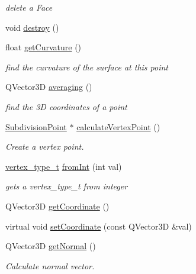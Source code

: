 \begin{DoxyCompactItemize}
\begin{DoxyCompactList}\small\item\em delete a Face \end{DoxyCompactList}\item 
void \hyperlink{classShipCADGeometry_1_1SubdivisionPoint_a63d20b811bb4af05b5f06014efd9385b}{destroy} ()
\item 
float \hyperlink{classShipCADGeometry_1_1SubdivisionPoint_aa07a859d70f97e57fc5318fc64a9d897}{get\-Curvature} ()
\begin{DoxyCompactList}\small\item\em find the curvature of the surface at this point \end{DoxyCompactList}\item 
Q\-Vector3\-D \hyperlink{classShipCADGeometry_1_1SubdivisionPoint_a0c9e47af796dacd9542d065bbd0d0fcf}{averaging} ()
\begin{DoxyCompactList}\small\item\em find the 3\-D coordinates of a point \end{DoxyCompactList}\item 
\hyperlink{classShipCADGeometry_1_1SubdivisionPoint}{Subdivision\-Point} $\ast$ \hyperlink{classShipCADGeometry_1_1SubdivisionPoint_a92632ddbe28fb6901e445b60eab8d3ee}{calculate\-Vertex\-Point} ()
\begin{DoxyCompactList}\small\item\em Create a vertex point. \end{DoxyCompactList}\item 
\hyperlink{classShipCADGeometry_1_1SubdivisionPoint_a03df9289cd8543cd3a567fa6c8e44c43}{vertex\-\_\-type\-\_\-t} \hyperlink{classShipCADGeometry_1_1SubdivisionPoint_a42fed467d1f925a9b8b6c46599cf81f4}{from\-Int} (int val)
\begin{DoxyCompactList}\small\item\em gets a vertex\-\_\-type\-\_\-t from integer \end{DoxyCompactList}\item 
Q\-Vector3\-D \hyperlink{classShipCADGeometry_1_1SubdivisionPoint_a0cf49d3e181eb00c08119721b33275bc}{get\-Coordinate} ()
\item 
virtual void \hyperlink{classShipCADGeometry_1_1SubdivisionPoint_a98ab99a0ccc4709a40e05b36147c0f55}{set\-Coordinate} (const Q\-Vector3\-D \&val)
\item 
Q\-Vector3\-D \hyperlink{classShipCADGeometry_1_1SubdivisionPoint_a8dd5facd4006480baea4a7f4487094f5}{get\-Normal} ()
\begin{DoxyCompactList}\small\item\em Calculate normal vector. \end{DoxyCompactList}\item 

\end{DoxyCompactItemize}
